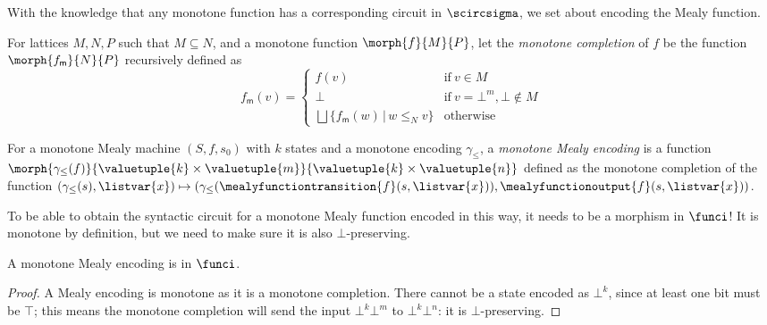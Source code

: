 With the knowledge that any monotone function has a corresponding circuit
in \(\scircsigma\), we set about encoding the Mealy function.

\begin{definition}\label{def:monotone-completion}
    For lattices \(M, N, P\) such that \(M \subseteq N\), and a monotone
    function \(\morph{f}{M}{P}\), let the \emph{monotone completion} of \(f\) be
    the function \(\morph{f_\mathsf{m}}{N}{P}\) recursively defined as \[
        f_\mathsf{m}(v) = \begin{cases}
            f(v)
             &
            \text{if}\ v \in M
            \\
            \bot
             &
            \text{if}\ v = \bot^m, \bot \not\in M
            \\
            \bigsqcup \{ f_\mathsf{m}(w) \,|\, w \leq_N v \}
             &
            \text{otherwise}
        \end{cases}
    \]
\end{definition}

\begin{definition}\label{def:mealy-encoding}
    For a monotone Mealy machine \((S, f, s_0)\) with \(k\) states and a
    monotone encoding \(\gamma_\leq\), a \emph{monotone Mealy encoding} is a
    function
    \(
    \morph{
        \gamma_\leq(f)
    }{
        \valuetuple{k} \times \valuetuple{m}
    }{
        \valuetuple{k} \times \valuetuple{n}
    }
    \) defined as the monotone completion of the function \(
    (\gamma_\leq(s), \listvar{x})
    \mapsto
    (
    \gamma_\leq(\mealyfunctiontransition{f}(s, \listvar{x})),
    \mealyfunctionoutput{f}(s, \listvar{x})
    )
    \).
\end{definition}

To be able to obtain the syntactic circuit for a monotone Mealy function encoded
in this way, it needs to be a morphism in \(\funci\)!
It is monotone by definition, but we need to make sure it is also
\(\bot\)-preserving.

\begin{lemma}
    A monotone Mealy encoding is in \(\funci\).
\end{lemma}
\begin{proof}
    A Mealy encoding is monotone as it is a monotone completion.
    There cannot be a state encoded as \(\bot^k\), since at least one bit must
    be \(\top\); this means the monotone completion will send the input
    \(\bot^k\bot^m\) to \(\bot^k\bot^n\): it is
    \(\bot\)-preserving.
\end{proof}

